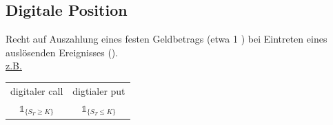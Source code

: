 
\subsection{Digitale Position}
\label{sub: digitale_position}
Recht auf Auszahlung eines festen Geldbetrags (etwa 1 \texteuro) bei Eintreten eines auslösenden Ereignisses ().\\
\uline{z.B.}\\
\begin{tabular}{c c}
	digitaler call & digtialer put\\
	$\mathbb{1}_{\{S_T\ge K\}}$ & $\mathbb{1}_{\{S_T\le K \}}$ \\
\end{tabular}



